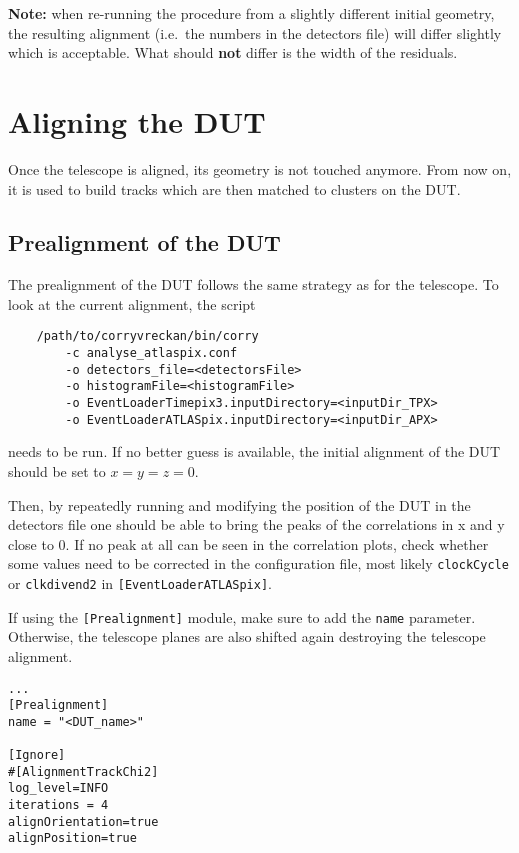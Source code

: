 \textbf{Note:} when re-running the procedure from a slightly different initial geometry, the resulting alignment (i.e.~the numbers in the detectors file) will differ slightly which is acceptable. What should \textbf{not} differ is the width of the residuals.


\section{Aligning the DUT}
\label{sec:align_dut}
Once the telescope is aligned, its geometry is not touched anymore. From now on, it is used to build tracks which are then matched to clusters on the DUT.

\subsection*{Prealignment of the DUT}
The prealignment of the DUT follows the same strategy as for the telescope. To look at the current alignment, the script
\begin{verbatim}
    /path/to/corryvreckan/bin/corry 
    	-c analyse_atlaspix.conf 
    	-o detectors_file=<detectorsFile> 
    	-o histogramFile=<histogramFile> 
    	-o EventLoaderTimepix3.inputDirectory=<inputDir_TPX>
    	-o EventLoaderATLASpix.inputDirectory=<inputDir_APX>
\end{verbatim}
needs to be run.
If no better guess is available, the initial alignment of the DUT should be set to $x=y=z=0$.

Then, by repeatedly running \corry and modifying the position of the DUT in the detectors file one should be able to bring the peaks of the correlations in x and y close to 0.
If no peak at all can be seen in the correlation plots, check whether some values need to be corrected in the configuration file, most likely \texttt{clockCycle} or \texttt{clkdivend2} in \texttt{[EventLoaderATLASpix]}.

If using the \texttt{[Prealignment]} module, make sure to add the \texttt{name} parameter.
Otherwise, the telescope planes are also shifted again destroying the telescope alignment.

\begin{verbatim}
...
[Prealignment]
name = "<DUT_name>"

[Ignore]
#[AlignmentTrackChi2]
log_level=INFO
iterations = 4
alignOrientation=true
alignPosition=true
\end{verbatim}

